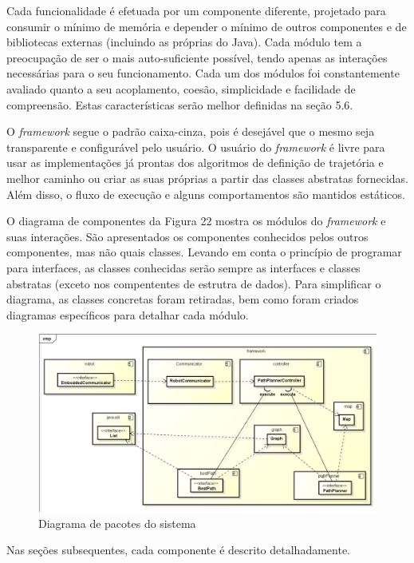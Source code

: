Cada funcionalidade é efetuada por um componente diferente, projetado para consumir o mínimo de memória e depender o mínimo de outros componentes e de bibliotecas externas (incluindo as próprias do Java). Cada módulo tem a preocupação de ser o mais auto-suficiente possível, tendo apenas as interações necessárias para o seu funcionamento. Cada um dos módulos foi constantemente avaliado quanto a seu acoplamento, coesão,  simplicidade e facilidade de compreensão. Estas características serão melhor definidas na seção 5.6.

O \textit{framework} segue o padrão caixa-cinza, pois é desejável que o mesmo seja transparente e configurável pelo usuário. O usuário do \textit{framework} é livre para usar as implementações já prontas dos algoritmos de definição de trajetória e melhor caminho ou criar as suas próprias a partir das classes abstratas fornecidas. Além disso, o fluxo de execução e alguns comportamentos são mantidos estáticos.

O diagrama de componentes da Figura 22 mostra os módulos do \textit{framework} e suas interações. São apresentados os componentes conhecidos pelos outros componentes, mas não quais classes. Levando em conta o princípio de programar para interfaces, as classes conhecidas serão sempre as interfaces e classes abstratas (exceto nos compententes de estrutra de dados). Para simplificar o diagrama, as classes concretas foram retiradas, bem como foram criados diagramas específicos para detalhar cada módulo.

\begin{figure}[h]
	\centering
	\label{fig22}
		\includegraphics[keepaspectratio=true,scale=0.4]{figuras/componentes.png}
	\caption{Diagrama de pacotes do sistema}
\end{figure}

Nas seções subsequentes, cada componente é descrito detalhadamente.


